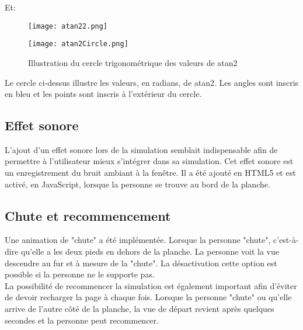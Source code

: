 Et: 
\begin{figure}[H]
	\centering
	\texttt{[image: atan22.png]} 
\end{figure}

\begin{figure}[H]
	\centering
	\texttt{[image: atan2Circle.png]} 
	\caption{\label{atan2circle} Illustration du cercle trigonométrique des valeurs de atan2}
\end{figure}
Le cercle ci-dessus illustre les valeurs, en radians, de atan2. Les angles sont inscris en bleu et les points sont inscris à l'extérieur du cercle. 


\subsection*{Effet sonore}  \label{sonore}
L'ajout d'un effet sonore lors de la simulation semblait indispensable afin de permettre à l'utilisateur mieux s'intégrer dans sa simulation. Cet effet sonore est un enregistrement du bruit ambiant à la fenêtre. Il a été ajouté en HTML5 et est activé, en \textsf{JavaScript}, lorsque la personne se trouve au bord de la planche.

\subsection*{Chute et recommencement}  \label{chute}
Une animation de "chute" a été implémentée. Lorsque la personne "chute", c'est-à-dire qu'elle a les deux pieds en dehors de la planche. La personne voit la vue descendre au fur et à mesure de la "chute". La désactivation cette option est possible si la personne ne le supporte pas. \\

La possibilité de recommencer la simulation est également important afin d'éviter de devoir recharger la page à chaque fois. Lorsque la personne "chute" ou qu'elle arrive de l'autre côté de la planche, la vue de départ revient après quelques secondes et la personne peut recommencer.